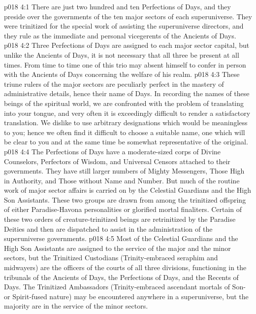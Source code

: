 %
\vs p018 4:1 There are just two hundred and ten Perfections of Days, and they preside over the governments of the ten major sectors of each superuniverse. They were trinitized for the special work of assisting the superuniverse directors, and they rule as the immediate and personal vicegerents of the Ancients of Days.
\vs p018 4:2 Three Perfections of Days are assigned to each major sector capital, but unlike the Ancients of Days, it is not necessary that all three be present at all times. From time to time one of this trio may absent himself to confer in person with the Ancients of Days concerning the welfare of his realm.
\pc \vs p018 4:3 These triune rulers of the major sectors are peculiarly perfect in the mastery of administrative details, hence their name of Days. In recording the names of these beings of the spiritual world, we are confronted with the problem of translating into your tongue, and very often it is exceedingly difficult to render a satisfactory translation. We dislike to use arbitrary designations which would be meaningless to you; hence we often find it difficult to choose a suitable name, one which will be clear to you and at the same time be somewhat representative of the original.
\pc \vs p018 4:4 The Perfections of Days have a moderate\hyp{}sized corps of Divine Counselors, Perfectors of Wisdom, and Universal Censors attached to their governments. They have still larger numbers of Mighty Messengers, Those High in Authority, and Those without Name and Number. But much of the routine work of major sector affairs is carried on by the Celestial Guardians and the High Son Assistants. These two groups are drawn from among the trinitized offspring of either Paradise\hyp{}Havona personalities or glorified mortal finaliters. Certain of these two orders of creature\hyp{}trinitized beings are retrinitized by the Paradise Deities and then are dispatched to assist in the administration of the superuniverse governments.
\vs p018 4:5 Most of the Celestial Guardians and the High Son Assistants are assigned to the service of the major and the minor sectors, but the Trinitized Custodians (Trinity\hyp{}embraced seraphim and midwayers) are the officers of the courts of all three divisions, functioning in the tribunals of the Ancients of Days, the Perfections of Days, and the Recents of Days. The Trinitized Ambassadors (Trinity\hyp{}embraced ascendant mortals of Son\hyp{} or Spirit\hyp{}fused nature) may be encountered anywhere in a superuniverse, but the majority are in the service of the minor sectors.
